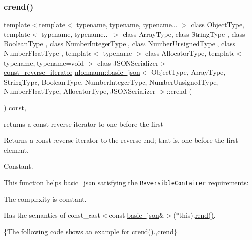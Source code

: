 \subsubsection{\texorpdfstring{crend()}{crend()}}
{\footnotesize\ttfamily template$<$template$<$ typename, typename, typename... $>$ class Object\+Type, template$<$ typename, typename... $>$ class Array\+Type, class String\+Type , class Boolean\+Type , class Number\+Integer\+Type , class Number\+Unsigned\+Type , class Number\+Float\+Type , template$<$ typename $>$ class Allocator\+Type, template$<$ typename, typename=void $>$ class J\+S\+O\+N\+Serializer$>$ \\
\hyperlink{classnlohmann_1_1basic__json_a72be3c24bfa24f0993d6c11af03e7404}{const\+\_\+reverse\+\_\+iterator} \hyperlink{classnlohmann_1_1basic__json}{nlohmann\+::basic\+\_\+json}$<$ Object\+Type, Array\+Type, String\+Type, Boolean\+Type, Number\+Integer\+Type, Number\+Unsigned\+Type, Number\+Float\+Type, Allocator\+Type, J\+S\+O\+N\+Serializer $>$\+::crend (\begin{DoxyParamCaption}{ }\end{DoxyParamCaption}) const\hspace{0.3cm}{\ttfamily [inline]}, {\ttfamily [noexcept]}}



returns a const reverse iterator to one before the first 

Returns a const reverse iterator to the reverse-\/end; that is, one before the first element.

  Constant.

This function helps {\ttfamily \hyperlink{classnlohmann_1_1basic__json}{basic\+\_\+json}} satisfying the \href{http://en.cppreference.com/w/cpp/concept/ReversibleContainer}{\tt Reversible\+Container} requirements\+:
\begin{DoxyItemize}
\item The complexity is constant.
\item Has the semantics of {\ttfamily const\+\_\+cast$<$const \hyperlink{classnlohmann_1_1basic__json}{basic\+\_\+json}\&$>$($\ast$this).\hyperlink{classnlohmann_1_1basic__json_ac77aed0925d447744676725ab0b6d535}{rend()}}.
\end{DoxyItemize}

\{The following code shows an example for {\ttfamily \hyperlink{classnlohmann_1_1basic__json_a5795b029dbf28e0cb2c7a439ec5d0a88}{crend()}}.,crend\}

